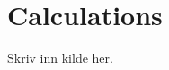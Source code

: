 \documentclass{article}
\begin{document}
\clearpage
\appendix %
\section{Calculations} 

\begin{thebibliography}{9}
	Skriv inn kilde her.
\end{thebibliography}
\end{document}
